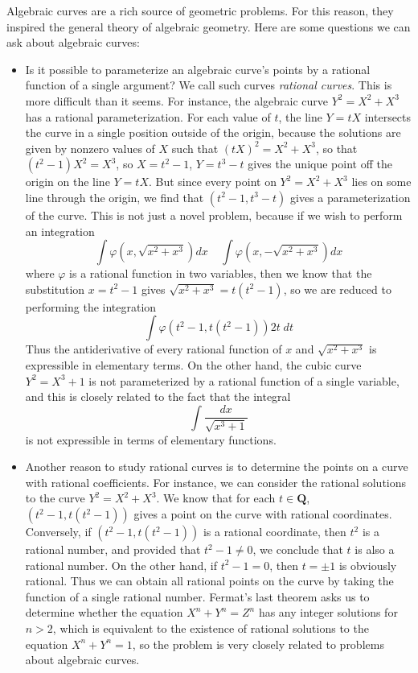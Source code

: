 Algebraic curves are a rich source of geometric problems. For this reason, they inspired the general theory of algebraic geometry. Here are some questions we can ask about algebraic curves:
%
\begin{itemize}
    \item Is it possible to parameterize an algebraic curve's points by a rational function of a single argument? We call such curves \emph{rational curves}. This is more difficult than it seems. For instance, the algebraic curve $Y^2 = X^2 + X^3$ has a rational parameterization. For each value of $t$, the line $Y = tX$ intersects the curve in a single position outside of the origin, because the solutions are given by nonzero values of $X$ such that $(tX)^2 = X^2 + X^3$, so that $(t^2 - 1)X^2 = X^3$, so $X = t^2 - 1$, $Y = t^3 - t$ gives the unique point off the origin on the line $Y = tX$. But since every point on $Y^2 = X^2 + X^3$ lies on some line through the origin, we find that $(t^2 - 1, t^3 - t)$ gives a parameterization of the curve. This is not just a novel problem, because if we wish to perform an integration
    \[ \int \varphi \left(x, \sqrt{x^2 + x^3} \right) dx\ \ \ \ \ \int \varphi \left( x, - \sqrt{x^2 + x^3} \right) dx \]
    where $\varphi$ is a rational function in two variables, then we know that the substitution $x = t^2 - 1$ gives $\sqrt{x^2 + x^3} = t(t^2 - 1)$, so we are reduced to performing the integration
    \[ \int \varphi(t^2 - 1, t(t^2 - 1)) 2t\; dt \]
    Thus the antiderivative of every rational function of $x$ and $\sqrt{x^2 + x^3}$ is expressible in elementary terms. On the other hand, the cubic curve $Y^2 = X^3 + 1$ is not parameterized by a rational function of a single variable, and this is closely related to the fact that the integral
    \[ \int \frac{dx}{\sqrt{x^3 + 1}} \]
    is not expressible in terms of elementary functions.

    \item Another reason to study rational curves is to determine the points on a curve with rational coefficients. For instance, we can consider the rational solutions to the curve $Y^2 = X^2 + X^3$. We know that for each $t \in \mathbf{Q}$, $(t^2 - 1, t(t^2 - 1))$ gives a point on the curve with rational coordinates. Conversely, if $(t^2 - 1, t(t^2 - 1))$ is a rational coordinate, then $t^2$ is a rational number, and provided that $t^2 - 1 \neq 0$, we conclude that $t$ is also a rational number. On the other hand, if $t^2 - 1 = 0$, then $t = \pm 1$ is obviously rational. Thus we can obtain all rational points on the curve by taking the function of a single rational number. Fermat's last theorem asks us to determine whether the equation $X^n + Y^n = Z^n$ has any integer solutions for $n > 2$, which is equivalent to the existence of rational solutions to the equation $X^n + Y^n = 1$, so the problem is very closely related to problems about algebraic curves.


\end{itemize}
